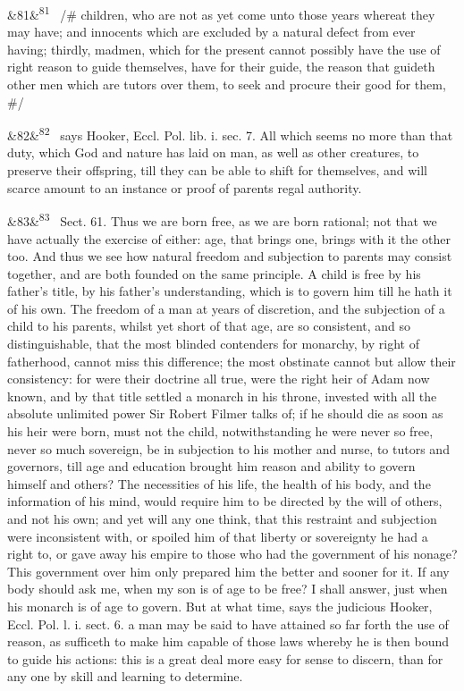 \documentclass[12pt]{article}
\newcommand{\para}[1][]{\par\noindent\ifx&#1&\else\textsuperscript{\footnotesize #1}~\fi}
\begin{document}
\para[81] /\# children, who are not as yet come unto those years whereat they may have; and innocents which are excluded by a natural defect from ever having; thirdly, madmen, which for the present cannot possibly have the use of right reason to guide themselves, have for their guide, the reason that guideth other men which are tutors over them, to seek and procure their good for them, \#/

\para[82] says Hooker, Eccl. Pol. lib. i. sec. 7. All which seems no more than that duty, which God and nature has laid on man, as well as other creatures, to preserve their offspring, till they can be able to shift for themselves, and will scarce amount to an instance or proof of parents regal authority.

\para[83] Sect. 61. Thus we are born free, as we are born rational; not that we have actually the exercise of either: age, that brings one, brings with it the other too. And thus we see how natural freedom and subjection to parents may consist together, and are both founded on the same principle. A child is free by his father's title, by his father's understanding, which is to govern him till he hath it of his own. The freedom of a man at years of discretion, and the subjection of a child to his parents, whilst yet short of that age, are so consistent, and so distinguishable, that the most blinded contenders for monarchy, by right of fatherhood, cannot miss this difference; the most obstinate cannot but allow their consistency: for were their doctrine all true, were the right heir of Adam now known, and by that title settled a monarch in his throne, invested with all the absolute unlimited power Sir Robert Filmer talks of; if he should die as soon as his heir were born, must not the child, notwithstanding he were never so free, never so much sovereign, be in subjection to his mother and nurse, to tutors and governors, till age and education brought him reason and ability to govern himself and others? The necessities of his life, the health of his body, and the information of his mind, would require him to be directed by the will of others, and not his own; and yet will any one think, that this restraint and subjection were inconsistent with, or spoiled him of that liberty or sovereignty he had a right to, or gave away his empire to those who had the government of his nonage? This government over him only prepared him the better and sooner for it. If any body should ask me, when my son is of age to be free? I shall answer, just when his monarch is of age to govern. But at what time, says the judicious Hooker, Eccl. Pol. l. i. sect. 6. a man may be said to have attained so far forth the use of reason, as sufficeth to make him capable of those laws whereby he is then bound to guide his actions: this is a great deal more easy for sense to discern, than for any one by skill and learning to determine.
\end{document}
